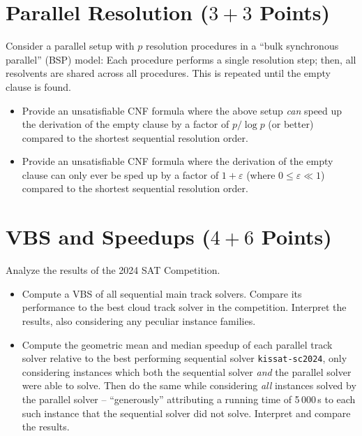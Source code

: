 \documentclass[a4paper]{article}
\begin{document}

\section{Parallel Resolution ($3+3$ Points)}

Consider a parallel setup with $p$ resolution procedures in a ``bulk synchronous parallel'' (BSP) model:
Each procedure performs a single resolution step; then, all resolvents are shared across all procedures. This is repeated until the empty clause is found.
\begin{itemize}
	\item[(a)] Provide an unsatisfiable CNF formula where the above setup \emph{can} speed up the derivation of the empty clause by a factor of $p / \log{p}$ (or better) compared to the shortest sequential resolution order.
	\item[(b)] Provide an unsatisfiable CNF formula where the derivation of the empty clause can only ever be sped up by a factor of $1 + \varepsilon$ (where $0 \leq \varepsilon \ll 1$) compared to the shortest sequential resolution order.
\end{itemize}

\section{VBS and Speedups ($4+6$ Points)}

Analyze the results of the 2024 SAT Competition.
\begin{itemize}
	\item[(a)] Compute a VBS of all sequential main track solvers.
	Compare its performance to the best cloud track solver in the competition.
	Interpret the results, also considering any peculiar instance families.
	\item[(b)] Compute the geometric mean and median speedup of each parallel track solver relative to the best performing sequential solver \texttt{kissat-sc2024}, only considering instances which both the sequential solver \emph{and} the parallel solver were able to solve.
	Then do the same while considering \textit{all} instances solved by the parallel solver -- ``generously'' attributing a running time of 5\,000\,s to each such instance that the sequential solver did not solve.
	Interpret and compare the results.
\end{itemize}
\end{document}

